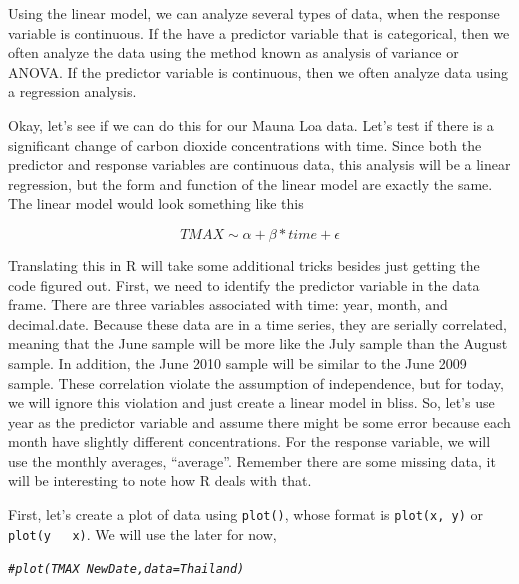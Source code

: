 \documentclass{article}\usepackage[]{graphicx}\usepackage[]{color}
\makeatletter
\newcommand{\hlcom}[1]{\textcolor[rgb]{0.678,0.584,0.686}{\textit{#1}}}%
\newenvironment{kframe}{%
 \def\at@end@of@kframe{}%
 \ifinner\ifhmode%
  \def\at@end@of@kframe{\end{minipage}}%
  \begin{minipage}{\columnwidth}%
 \fi\fi%
 \def\FrameCommand##1{\hskip\@totalleftmargin \hskip-\fboxsep
 \colorbox{shadecolor}{##1}\hskip-\fboxsep
     \hskip-\linewidth \hskip-\@totalleftmargin \hskip\columnwidth}%
 \MakeFramed {\advance\hsize-\width
   \@totalleftmargin\z@ \linewidth\hsize
   \@setminipage}}%
 {\par\unskip\endMakeFramed%
 \at@end@of@kframe}
\newenvironment{knitrout}{}{} %
\makeatother
\begin{document}
Using the linear model, we can analyze several types of data, when the response variable is continuous. If the have a predictor variable that is categorical, then we often analyze the data using the method known as analysis of variance or ANOVA. If the predictor variable is continuous, then we often analyze data using a regression analysis. 

Okay, let's see if we can do this for our Mauna Loa data. Let's test if there is a significant change of carbon dioxide concentrations with time. Since both the predictor and response variables are continuous data, this analysis will be a linear regression, but the form and function of the linear model are exactly the same. The linear model would look something like this

\begin{equation}
TMAX \sim \alpha + \beta * time + \epsilon
\end{equation}

Translating this in R will take some additional tricks besides just getting the code figured out. First, we need to identify the predictor variable in the data frame. There are three variables associated with time: year, month, and decimal.date. Because these data are in a time series, they are serially correlated, meaning that the June sample will be more like the July sample than the August sample. In addition, the June 2010 sample will be similar to the June 2009 sample. These correlation violate the assumption of independence, but for today, we will ignore this violation and just create a linear model in bliss. So, let's use year as the predictor variable and assume there might be some error because each month have slightly different concentrations. For the response variable, we will use the monthly averages, "`average"'. Remember there are some missing data, it will be interesting to note how R deals with that.

First, let's create a plot of data using \texttt{plot()}, whose format is \texttt{plot(x, y)} or \texttt{plot(y ~ x)}. We will use the later for now, 

\begin{knitrout}
\color{fgcolor}\begin{kframe}
\begin{alltt}
\hlcom{#plot(TMAX ~ NewDate, data=Thailand)}
\end{alltt}
\end{kframe}
\end{knitrout}
\end{document}
